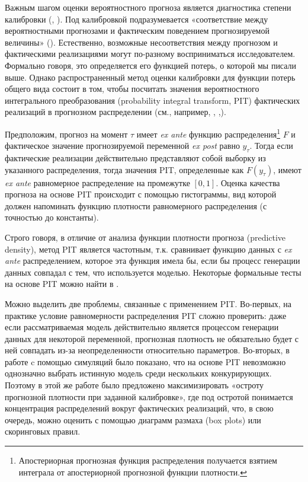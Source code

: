 \documentclass[11pt]{article} %
\begin{document}
Важным шагом оценки вероятностного прогноза является %
диагностика  степени калибровки (\cite{gneiting_al_2007}, \cite{mitchell_wallis_2011}). Под калибровкой подразумевается «соответствие между вероятностными прогнозами и фактическим поведением прогнозируемой величины» (\cite[p.118]{tsyplakov_2012}). Естественно, возможные несоответствия между прогнозом и фактическими реализациями могут по-разному восприниматься исследователем. Формально говоря, это определяется его функцией потерь, о которой мы писали выше. Однако распространенный метод оценки калибровки для функции потерь общего вида состоит в том, чтобы посчитать значения вероятностного интегрального преобразования (probability integral transform, PIT) фактических реализаций в прогнозном распределении (см., например, \cite{diebold_al_1998},
\cite{gerdrup_al_2009},\cite{gonzalez-rivera_sun_2015}).


Предположим, прогноз на момент $\tau$ имеет \textit{ex ante}  функцию распределения\footnote{Апостериорная прогнозная функция распределения получается взятием интеграла от апостериорной прогнозной функции плотности.} $F$ и фактическое значение прогнозируемой переменной \textit{ex post}  равно $y_{\tau}$. Тогда если фактические реализации действительно представляют собой выборку из указанного распределения, тогда значения PIT, определенные как $F(y_{\tau})$, имеют \textit{ex ante} равномерное распределение на промежутке $[0, 1]$. Оценка качества прогноза на основе PIT происходит с помощью гистограммы, вид которой должен напоминать функцию плотности равномерного распределения (с точностью до константы).

Строго говоря, в отличие от анализа функции плотности прогноза (predictive density), метод  PIT является частотным, т.к. сравнивает функцию данных с \textit{ex ante} распределением, которое эта функция имела бы, если бы процесс генерации данных совпадал с тем, что используется моделью. Некоторые формальные тесты на основе PIT можно найти в \cite{geweke_amisano_2010}.

Можно выделить две проблемы, связанные с применением PIT. Во-первых, на практике условие равномерности распределения PIT сложно проверить: даже если рассматриваемая модель действительно является процессом генерации данных для некоторой переменной, прогнозная плотность не обязательно будет с ней совпадать из-за неопределенности относительно параметров. Во-вторых,  в работе \cite{gneiting_al_2007} c помощью симуляций было показано, что на основе PIT невозможно однозначно выбрать истинную модель среди нескольких конкурирующих. Поэтому в этой же работе было предложено максимизировать «остроту прогнозной плотности при заданной калибровке», где под остротой понимается концентрация распределений вокруг фактических реализаций, что, в свою очередь, можно оценить с помощью диаграмм размаха (box plots) или скоринговых правил.
\end{document}
